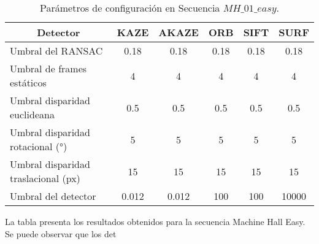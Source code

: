 \begin{table}[H]
	\caption{Parámetros de configuración en Secuencia $MH\_ 01\_ easy$.}
	\begin{tabular}{|l|c|c|c|c|c|}
		\hline
		\multicolumn{1}{|c|}{\textbf{Detector}} & \textbf{KAZE} & \textbf{AKAZE} & \textbf{ORB} & \textbf{SIFT} & \textbf{SURF} \\ \hline
		Umbral del RANSAC & 0.18 & 0.18 & 0.18 & 0.18 & 0.18 \\ \hline
		Umbral de frames estáticos & 4 & 4 & 4 & 4 & 4 \\ \hline
		Umbral disparidad euclideana & 0.5 & 0.5 & 0.5 & 0.5 & 0.5 \\ \hline
		Umbral disparidad rotacional (°) & 5 & 5 & 5 & 5 & 5 \\ \hline
		Umbral disparidad traslacional (px) & 15 & 15 & 15 & 15 & 15 \\ \hline
		Umbral del detector & 0.012 & 0.012 & 100 & 100 & 10000 \\ \hline
	\end{tabular}
	\label{Tabla/Parametros/MH_01_easy}
\end{table}


La tabla \label{Tabla/Resultados/MH_01_easy} presenta los resultados obtenidos para la secuencia Machine Hall Easy. Se puede observar que los det


